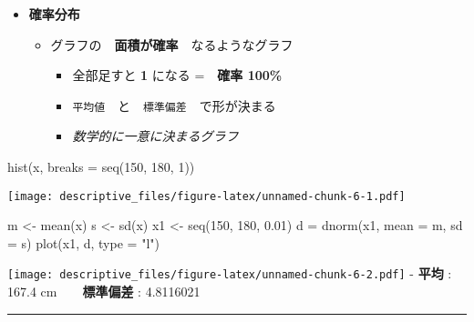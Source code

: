 \documentclass[
]{article}
\newenvironment{Shaded}{\begin{snugshade}}{\end{snugshade}}
\newcommand{\AttributeTok}[1]{\textcolor[rgb]{0.77,0.63,0.00}{#1}}
\newcommand{\DecValTok}[1]{\textcolor[rgb]{0.00,0.00,0.81}{#1}}
\newcommand{\FloatTok}[1]{\textcolor[rgb]{0.00,0.00,0.81}{#1}}
\newcommand{\FunctionTok}[1]{\textcolor[rgb]{0.00,0.00,0.00}{#1}}
\newcommand{\NormalTok}[1]{#1}
\newcommand{\OtherTok}[1]{\textcolor[rgb]{0.56,0.35,0.01}{#1}}
\newcommand{\StringTok}[1]{\textcolor[rgb]{0.31,0.60,0.02}{#1}}
\begin{document}
\begin{itemize}
\item
  \textbf{確率分布}

  \begin{itemize}
  \item
    グラフの　\textbf{面積が確率}　なるようなグラフ

    \begin{itemize}
    \item
      全部足すと \textbf{1} になる =　\textbf{確率 100\%}
    \item
      \texttt{平均値}　と　\texttt{標準偏差}　で形が決まる
    \item
      \emph{数学的に一意に決まるグラフ}
    \end{itemize}
  \end{itemize}
\end{itemize}

\begin{Shaded}
\begin{Highlighting}[]
\FunctionTok{hist}\NormalTok{(x, }\AttributeTok{breaks =} \FunctionTok{seq}\NormalTok{(}\DecValTok{150}\NormalTok{, }\DecValTok{180}\NormalTok{, }\DecValTok{1}\NormalTok{))}
\end{Highlighting}
\end{Shaded}

\texttt{[image: descriptive\_files/figure-latex/unnamed-chunk-6-1.pdf]}

\begin{Shaded}
\begin{Highlighting}[]
\NormalTok{m }\OtherTok{\textless{}{-}} \FunctionTok{mean}\NormalTok{(x)}
\NormalTok{s }\OtherTok{\textless{}{-}} \FunctionTok{sd}\NormalTok{(x)}
\NormalTok{x1 }\OtherTok{\textless{}{-}} \FunctionTok{seq}\NormalTok{(}\DecValTok{150}\NormalTok{, }\DecValTok{180}\NormalTok{, }\FloatTok{0.01}\NormalTok{)}
\NormalTok{d }\OtherTok{=} \FunctionTok{dnorm}\NormalTok{(x1, }\AttributeTok{mean =}\NormalTok{ m, }\AttributeTok{sd =}\NormalTok{ s)}
\FunctionTok{plot}\NormalTok{(x1, d, }\AttributeTok{type =} \StringTok{"l"}\NormalTok{)}
\end{Highlighting}
\end{Shaded}

\texttt{[image: descriptive\_files/figure-latex/unnamed-chunk-6-2.pdf]} -
\textbf{平均} : 167.4 cm　\textbar{}　\textbf{標準偏差} : 4.8116021

\begin{center}\rule{0.5\linewidth}{0.5pt}\end{center}
\end{document}
